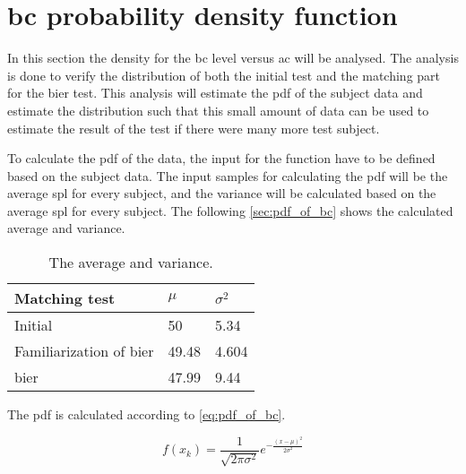 \section{\gls{bc} probability density function}
In this section the density for the \gls{bc} level versus \gls{ac} will be analysed. The analysis is done to verify the distribution of both the initial test and the matching part for the \gls{bier} test. This analysis will estimate the \gls{pdf} of the subject data and estimate the distribution such that this small amount of data can be used to estimate the result of the test if there were many more test subject. 

To calculate the \gls{pdf} of the data, the input for the function have to be defined based on the subject data. The input samples for calculating the  \gls{pdf} will be the average \gls{spl} for every subject, and the variance will be calculated based on the average \gls{spl} for every subject. The following \autoref{sec:pdf_of_bc} shows the calculated average and variance.

\begin{table}[H]
\centering
\caption{The average and variance.}
\begin{tabular}{l|ll}
Matching test                 & $\mu$ & $\sigma^2$ \\ \hline
Initial                       & 50    & 5.34       \\
Familiarization of \gls{bier} & 49.48 & 4.604      \\
\gls{bier}                    & 47.99 & 9.44      
\end{tabular}
\label{sec:pdf_of_bc}
\end{table}

The \gls{pdf} is calculated according to  \autoref{eq:pdf_of_bc}.




\begin{equation}\label{eq:pdf_of_bc}
f(x_{k}) = \frac{1}{\sqrt{2 \pi \sigma^2}}e^{-\frac{(x-\mu)^2}{2\sigma^2}}
\end{equation}






